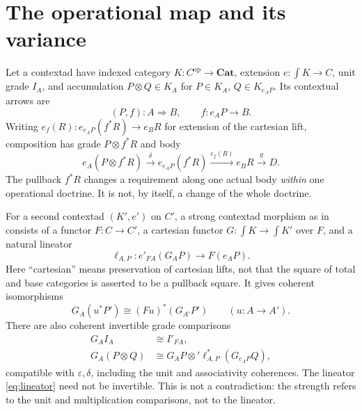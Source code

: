 \documentclass[11pt]{article}
\theoremstyle{definition}\newtheorem{definition}[theorem]{Definition}
\theoremstyle{remark}\newtheorem{remark}[theorem]{Remark}
\begin{document}
\section{The operational map and its variance}
Let a contextad have indexed category $K:C^{\mathrm{op}}\to\mathbf{Cat}$,
extension $e:\int K\to C$, unit grade $I_A$, and accumulation
$P\otimes Q\in K_A$ for $P\in K_A$, $Q\in K_{e_AP}$.
Its contextual arrows are
\[
 (P,f):A\Rightarrow B,\qquad f:e_AP\longrightarrow B.
\]
Writing $e_f(R):e_{e_AP}(f^*R)\to e_BR$ for extension of the cartesian lift,
composition has grade $P\otimes f^*R$ and body
\[
 e_A(P\otimes f^*R)\xrightarrow{\delta}e_{e_AP}(f^*R)
 \xrightarrow{e_f(R)}e_BR\xrightarrow{g}D.
\]
The pullback $f^*R$ changes a requirement along one actual body \emph{within}
one operational doctrine. It is not, by itself, a change of the whole doctrine.

For a second contextad $(K',e')$ on $C'$, a strong contextad morphism as in
\cite[Definition 5.25]{CM2} consists of a functor $F:C\to C'$, a cartesian
functor $G:\int K\to\int K'$ over $F$, and a natural lineator
\begin{equation}\label{eq:lineator}
 \ell_{A,P}:e'_{FA}(G_AP)\longrightarrow F(e_AP).
\end{equation}
Here ``cartesian'' means preservation of cartesian lifts, not that the square
of total and base categories is asserted to be a pullback square. It gives
coherent isomorphisms
\[
 G_A(u^*P')\cong(Fu)^*(G_{A'}P')\qquad(u:A\to A').
\]
There are also coherent invertible grade comparisons
\begin{align*}
 G_AI_A&\cong I'_{FA},\\
 G_A(P\otimes Q)&\cong
 G_AP\otimes'\ell_{A,P}^{*}(G_{e_AP}Q),
\end{align*}
compatible with $\varepsilon,\delta$, including the unit and associativity
coherences. The lineator \eqref{eq:lineator} need not be invertible. This is
not a contradiction: the strength refers to the unit and multiplication
comparisons, not to the lineator.
\end{document}
